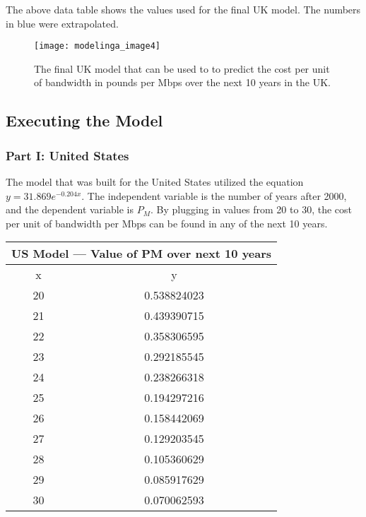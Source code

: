 \newcommand{\blue}{\color{blue}}
\newcommand{\black}{\color{black}}
The above data table shows the values used for the final UK model. The numbers in \blue blue \black were extrapolated.

    \renewcommand{\thefigure}{4}
    \begin{figure}[htp]
    \centering
    \begin{minipage}{9cm}
    \texttt{[image: modelinga\_image4]}
    \caption{The final UK model that can be used to to predict the cost per unit of bandwidth in pounds per Mbps over the next 10 years in the UK.}
    \label{fig:4}
    \end{minipage}
    
    \end{figure}
   
   \pagebreak
   \subsection*{Executing the Model}
   \subsubsection*{Part I: United States}
   The model that was built for the United States utilized the equation $y = 31.869e^{-0.204x}$. The independent variable is the number of years after 2000, and the dependent variable is $P_M$. By plugging in values from 20 to 30, the cost per unit of bandwidth per Mbps can be found in any of the next 10 years.
   
   \begin{center}
\begin{tabular}{|c|c|}
\hline
\multicolumn{2}{|c|}{US Model — Value of PM over next 10 years} \\ \hline
x                          & y                                  \\ \hline
20                         & 0.538824023                        \\ \hline
21                         & 0.439390715                        \\ \hline
22                         & 0.358306595                        \\ \hline
23                         & 0.292185545                        \\ \hline
24                         & 0.238266318                        \\ \hline
25                         & 0.194297216                        \\ \hline
26                         & 0.158442069                        \\ \hline
27                         & 0.129203545                        \\ \hline
28                         & 0.105360629                        \\ \hline
29                         & 0.085917629                        \\ \hline
30                         & 0.070062593                        \\ \hline
\end{tabular}
\end{center}
    
